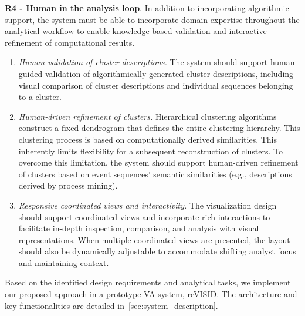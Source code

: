 \documentclass[preprint,journal]{vgtc}            %
\begin{document}
\noindent 
\textbf{R4 - Human in the analysis loop}. 
In addition to incorporating algorithmic support, the system must be able to incorporate domain expertise throughout the analytical workflow to
enable knowledge-based validation and interactive refinement of computational results.
\begin{enumerate}[label=T\arabic*., start=7, left=0cm, noitemsep, topsep=0pt, parsep=0pt]
    \item \textit{Human validation of cluster descriptions.} 
    The system should support human-guided validation of algorithmically generated cluster descriptions, 
    including visual comparison of cluster descriptions and individual sequences belonging to a cluster.
    
    \item \textit{Human-driven refinement of clusters.} 
    Hierarchical clustering algorithms construct a fixed dendrogram that defines the entire clustering hierarchy.
    This clustering process is based on computationally derived similarities.
    This inherently limits flexibility for a subsequent reconstruction of clusters.
    To overcome this limitation, the system should support human-driven refinement of clusters based on event sequences' semantic similarities (e.g., descriptions derived by process mining).

    \item \textit{Responsive coordinated views and interactivity.} 
    The visualization design should support coordinated views and incorporate rich interactions to facilitate in-depth inspection, comparison, and analysis with visual representations.
    When multiple coordinated views are presented, the layout should also be dynamically adjustable to accommodate shifting analyst focus and maintaining context.        
\end{enumerate}

Based on the identified design requirements and analytical tasks, we implement our proposed approach in a prototype VA system, reVISID.
The architecture and key functionalities are detailed in~\cref{sec:system_description}.
\end{document}
